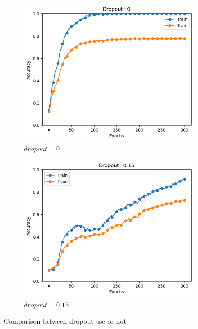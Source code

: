 \begin{figure}
    \centering
    \begin{subfigure}{.45\textwidth}
        \centering
        \includegraphics[width=\textwidth]{Figures/without dropout.png}
        \caption{$dropout = 0$}
        \label{dropout0}
    \end{subfigure}
    \hfill
    \begin{subfigure}{.45\textwidth}
        \centering
        \includegraphics[width=\textwidth]{Figures/use dropout.png}
        \caption{$dropout = 0.15$}
        \label{dropout015}
    \end{subfigure}
    \caption{Comparison between dropout use or not}
    \label{Comparison between dropout use or not}
\end{figure}
